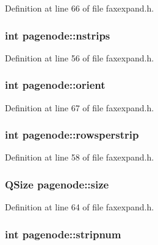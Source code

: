 Definition at line 66 of file faxexpand.\+h.

\hypertarget{classpagenode_a0568e4ac37e1a71573a2056e308cd8ee}{
\subsubsection[{nstrips}]{\setlength{\rightskip}{0pt plus 5cm}int pagenode\+::nstrips}}\label{classpagenode_a0568e4ac37e1a71573a2056e308cd8ee}


Definition at line 56 of file faxexpand.\+h.

\hypertarget{classpagenode_a1ba73a4704d3934e92b354cda5bd7ba5}{
\subsubsection[{orient}]{\setlength{\rightskip}{0pt plus 5cm}int pagenode\+::orient}}\label{classpagenode_a1ba73a4704d3934e92b354cda5bd7ba5}


Definition at line 67 of file faxexpand.\+h.

\hypertarget{classpagenode_a728753690c18f318610ba9de5cf6f798}{
\subsubsection[{rowsperstrip}]{\setlength{\rightskip}{0pt plus 5cm}int pagenode\+::rowsperstrip}}\label{classpagenode_a728753690c18f318610ba9de5cf6f798}


Definition at line 58 of file faxexpand.\+h.

\hypertarget{classpagenode_a2be79286e9fc2179f6e3f97dc72a56fa}{
\subsubsection[{size}]{\setlength{\rightskip}{0pt plus 5cm}Q\+Size pagenode\+::size}}\label{classpagenode_a2be79286e9fc2179f6e3f97dc72a56fa}


Definition at line 64 of file faxexpand.\+h.

\hypertarget{classpagenode_ac72e589a7653741a7a5b3c44e1bdddc3}{
\subsubsection[{stripnum}]{\setlength{\rightskip}{0pt plus 5cm}int pagenode\+::stripnum}}\label{classpagenode_ac72e589a7653741a7a5b3c44e1bdddc3}


